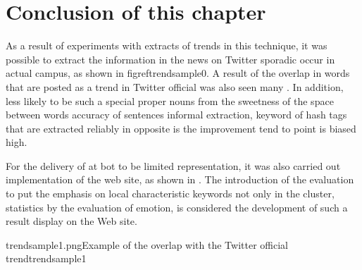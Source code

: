 
\section{Conclusion of this chapter}
As a result of experiments with extracts of trends in this technique, it was possible to extract the information in the news on Twitter sporadic occur in actual campus, as shown in figref{trendsample0}.
A result of the overlap in words that are posted as a trend in Twitter official was also seen many . In addition, less likely to be such a special proper nouns from the sweetness of the space between words accuracy of sentences informal extraction, keyword of hash tags that are extracted reliably in opposite is the improvement tend to point is biased high.

For the delivery of at bot to be limited representation, it was also carried out implementation of the web site, as shown in  \cite{trend_elzup_com}.
The introduction of the evaluation to put the emphasis on local characteristic keywords not only in the cluster, statistics by the evaluation of emotion, is considered the development of such a result display on the Web site.


{trendsample1.png}{Example of the overlap with the Twitter official trend}{trendsample1}


\newpage
